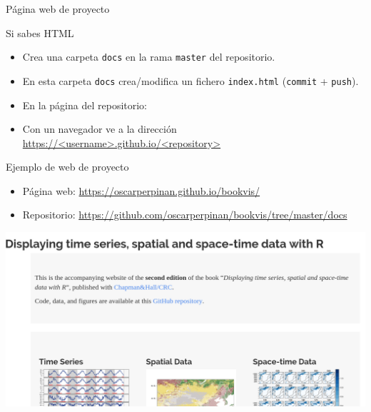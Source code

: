 \documentclass[xcolor={usenames,svgnames,dvipsnames}]{beamer}
\begin{document}
\begin{frame}[label={sec:org64863cc},fragile]{Página web de \alert{proyecto}}
 \begin{block}{Si sabes HTML}
\begin{itemize}
\item Crea una carpeta \texttt{docs} en la rama \texttt{master} del repositorio.

\item En esta carpeta \texttt{docs} crea/modifica un fichero \texttt{index.html} (\texttt{commit} + \texttt{push}).

\item En la página del repositorio:
\end{itemize}

\begin{center}
\end{center}

\begin{itemize}
\item Con un navegador ve a la dirección \url{https://<username>.github.io/<repository>}
\end{itemize}
\end{block}
\end{frame}
\begin{frame}[label={sec:org227a6d9}]{Ejemplo de web de \alert{proyecto}}
\begin{itemize}
\item Página web: \url{https://oscarperpinan.github.io/bookvis/}
\item Repositorio: \url{https://github.com/oscarperpinan/bookvis/tree/master/docs}
\end{itemize}

\begin{center}
\includegraphics[width=.9\linewidth]{figs/captura_bookvis.png}
\end{center}
\end{frame}
\end{document}
